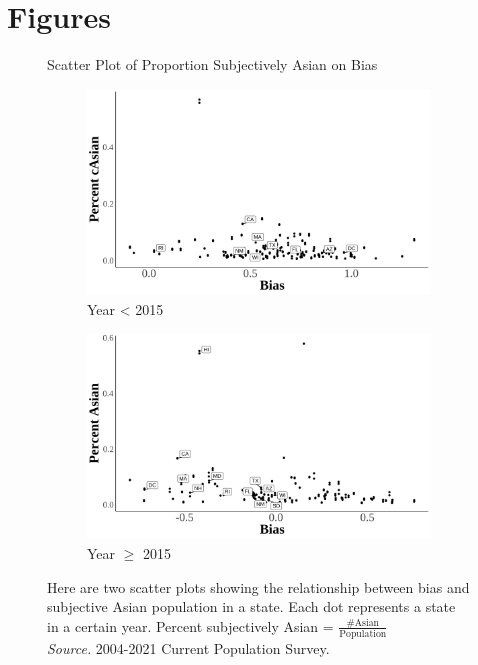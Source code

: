 \newpage
\pagebreak

\section{Figures}\label{appendix:figs}

\begin{figure}[H]
    \centering
    \caption{Scatter Plot of Proportion Subjectively Asian on Bias}
    \label{scatter-plot-1}
    \begin{subfigure}{.9\textwidth}
    \caption{Year < 2015}
    \centering
    \includegraphics[width=.9\linewidth]{scatter-plot-bias-Asian-less2015.png}
    \end{subfigure}
    \centering
    \begin{subfigure}{.9\textwidth}
    \caption{Year $\geq$ 2015}
    \centering
    \includegraphics[width=.9\linewidth]{scatter-plot-bias-Asian-great2015.png}
    \end{subfigure}
    \caption*{\footnotesize{Here are two scatter plots showing the relationship between bias and subjective Asian population in a state. Each dot represents a state in a certain year. Percent subjectively Asian = $\frac{\# \text{Asian}}{\text{Population}}$ \\
    \emph{Source.} 2004-2021 Current Population Survey.}}
    \end{figure}
    
